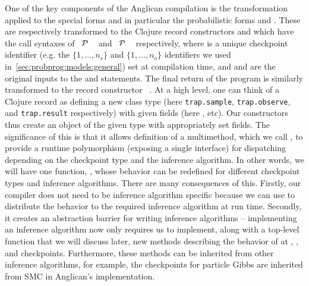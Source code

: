 One of the key components of the Anglican compilation is the transformation applied to
the special forms and in particular the probabilistic forms \sample and \observe.  These
are respectively transformed to the Clojure record constructors \samplecps and \observecps 
which have the call syntaxes of
 ~$\mathcal{P}$ ~\angstate\clj{)} and  ~$\mathcal{P}$ ~\angstate\clj{)}
respectively,
where  is a unique checkpoint identifier (e.g. the $\{1,\dots,n_s\}$ and $\{1,\dots,n_o\}$ identifiers
we used in~\ref{sec:probprog:models:general}) set at compilation time, and   and 
are the original inputs to the \sample and \observe statements.  
The final return of the program is similarly transformed to the record constructor
~\angstate\clj{)}.
At a high level, one can
think of a Clojure record as defining a new class type (here {\small \texttt{trap.sample}}, {\small \texttt{trap.observe}},
and {\small \texttt{trap.result}} respectively) with given fields (here ,  etc).  Our constructors thus create
an object of the given type with appropriately set fields.  The significance of this is that
it allows definition of a multimethod, which we call \checkpoint, to provide a runtime polymorphism
(exposing a single interface) for dispatching depending on the checkpoint
type and the inference algorithm.  In other words, we will have one function, \checkpoint, whose
behavior can be redefined for different checkpoint types and inference algorithms.  There are many
consequences of this.  Firstly, our compiler does not need to be inference algorithm specific
because we can use \checkpoint to distribute the behavior to the required inference algorithm
at run time.  Secondly, it creates an abstraction barrier for writing inference algorithms -- implementing
an inference algorithm now only requires us to implement, along with a top-level function \anginfer that
we will discuss later, new methods describing the behavior of \checkpoint at \sample, \observe, and 
checkpoints.  Furthermore, these methods can be inherited from other inference algorithms, for example,
the \observe checkpoints for particle Gibbs are inherited from SMC in Anglican's implementation.

